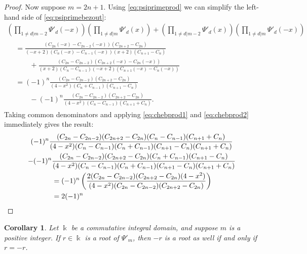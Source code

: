 \documentclass{amsart}
\theoremstyle{plain}
\newtheorem{cor}[thm]{Corollary}
\theoremstyle{definition}
\theoremstyle{remark}
\numberwithin{equation}{section}
\begin{document}
\begin{proof}
Now suppose $m=2n+1$. 
Using \eqref{eq:psiprimeprod} we can simplify the left-hand side of \eqref{eq:psiprimebezout}:
\begin{multline*}
\left(\prod_{1 \neq d|m-2} \Psi'_d(-x)\right)\left(\prod_{1 \neq d|m}\Psi'_d(x)\right)+\left(\prod_{1 \neq d|m-2} \Psi'_d(x)\right)\left(\prod_{1 \neq d|m}\Psi'_d(-x)\right) \\
\begin{aligned}
& = \frac{(C_{2n}(-x)-C_{2n-2}(-x))(C_{2n+2}-C_{2n})}{(-x+2)(C_{n}(-x)-C_{n-1}(-x))(x+2)(C_{n+1}-C_n)} \\
& \quad \quad {} + \frac{(C_{2n}-C_{2n-2})(C_{2n+2}(-x)-C_{2n}(-x))}{(x+2)(C_{n}-C_{n-1})(-x+2)(C_{n+1}(-x)-C_n(-x))} \\
& =(-1)^n \frac{(C_{2n}-C_{2n-2})(C_{2n+2}-C_{2n})}{(4-x^2)(C_{n}+C_{n-1})(C_{n+1}-C_n)} \\
& \quad \quad {} -(-1)^n\frac{(C_{2n}-C_{2n-2})(C_{2n+2}-C_{2n})}{(4-x^2)(C_{n}-C_{n-1})(C_{n+1}+C_n)} \text{.}%
\end{aligned}
\end{multline*}
Taking common denominators and applying \eqref{eq:chebprod1} and \eqref{eq:chebprod2} immediately gives the result:
\begin{multline*}
(-1)^n \frac{(C_{2n}-C_{2n-2})(C_{2n+2}-C_{2n})(C_{n}-C_{n-1})(C_{n+1}+C_n)}{(4-x^2)(C_{n}-C_{n-1})(C_n+C_{n-1})(C_{n+1}-C_n)(C_{n+1}+C_n)} \\
- (-1)^n\frac{(C_{2n}-C_{2n-2})(C_{2n+2}-C_{2n})(C_{n}+C_{n-1})(C_{n+1}-C_n)}{(4-x^2)(C_{n}-C_{n-1})(C_n+C_{n-1})(C_{n+1}-C_n)(C_{n+1}+C_n)} \\
\begin{aligned}
& =(-1)^n\left(\frac{2(C_{2n}-C_{2n-2})(C_{2n+2}-C_{2n})(4-x^2)}{(4-x^2)(C_{2n}-C_{2n-2})(C_{2n+2}-C_{2n})}\right) \\
& =2(-1)^n \qedhere
\end{aligned}
\end{multline*} 
\end{proof}

\begin{cor} \label{cor:psiprimerootsum}
Let $\Bbbk$ be a commutative integral domain, and suppose $m$ is a positive integer. 
If $r \in \Bbbk$ is a root of $\Psi'_m$, then $-r$ is a root as well if and only if $r=-r$.
\end{cor}
\end{document}
